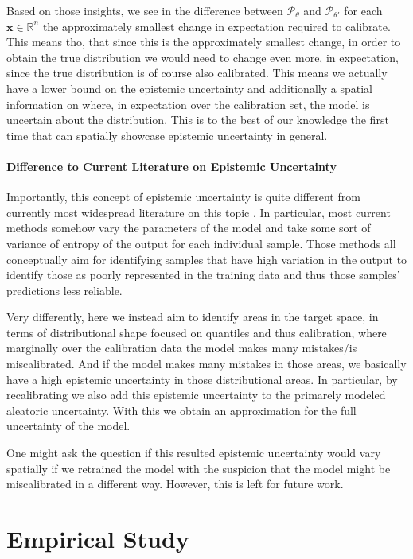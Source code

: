 Based on those insights, we see in the difference between $\mathscr{P}_\theta$ and $\mathscr{P}_{\theta'}$ for each $\mathbf{x}\in\mathbb{R}^n$ the approximately smallest change in expectation required to calibrate. This means tho, that since this is the approximately smallest change, in order to obtain the true distribution we would need to change even more, in expectation, since the true distribution is of course also calibrated. This means we actually have a lower bound on the epistemic uncertainty and additionally a spatial information on where, in expectation over the calibration set, the model is uncertain about the distribution. This is to the best of our knowledge the first time that can spatially showcase epistemic uncertainty in general.

\subsubsection{Difference to Current Literature on Epistemic Uncertainty}

Importantly, this concept of epistemic uncertainty is quite different from currently most widespread literature on this topic \cite{gal_dropout_2016,hullermeier_aleatoric_2021}. In particular, most current methods somehow vary the parameters of the model and take some sort of variance of entropy of the output for each individual sample. Those methods all conceptually aim for identifying samples that have high variation in the output to identify those as poorly represented in the training data and thus those samples' predictions less reliable.

Very differently, here we instead aim to identify areas in the target space, in terms of distributional shape focused on quantiles and thus calibration, where marginally over the calibration data the model makes many mistakes/is miscalibrated. And if the model makes many mistakes in those areas, we basically have a high epistemic uncertainty in those distributional areas. In particular, by recalibrating we also add this epistemic uncertainty to the primarely modeled aleatoric uncertainty. With this we obtain an approximation for the full uncertainty of the model.

One might ask the question if this resulted epistemic uncertainty would vary spatially if we retrained the model with the suspicion that the model might be miscalibrated in a different way. However, this is left for future work.

\chapter{Empirical Study}\label{chap:empirical_study}

